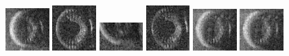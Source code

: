 \begin{figure}
    \includegraphics[width=0.15\textwidth]{chapters/images/dataset/all-class-images/tire/tire-178.jpg}
    \includegraphics[width=0.15\textwidth]{chapters/images/dataset/all-class-images/tire/tire-307.jpg}
    \includegraphics[width=0.15\textwidth]{chapters/images/dataset/all-class-images/tire/tire-42.jpg}
    \includegraphics[width=0.15\textwidth]{chapters/images/dataset/all-class-images/tire/tire-205.jpg}
    \includegraphics[width=0.15\textwidth]{chapters/images/dataset/all-class-images/tire/tire-136.jpg}
    \includegraphics[width=0.15\textwidth]{chapters/images/dataset/all-class-images/tire/tire-137.jpg}
    

\end{figure}
